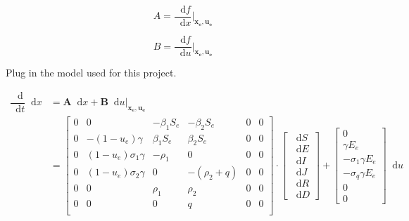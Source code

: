 \documentclass[fleqn]{article}
\newcommand*\diff{\mathop{}\!\mathrm{d}}
\begin{document}
\begin{equation*}
    A = \dfrac{\diff f}{\diff x} \bigg\rvert_{\bm{x_e}, \bm{u_e}}
\end{equation*}

\begin{equation*}
    B = \dfrac{\diff f}{\diff u} \bigg\rvert_{\bm{x_e}, \bm{u_e}}
\end{equation*}

Plug in the model used for this project.

\begin{equation*}
    \begin{split}
        \dfrac{\diff}{\diff t} \diff x & = \bm{A} \diff x + \bm{B} \diff u \bigg\rvert_{\bm{x_e}, \bm{u_e}} \\
            & = \begin{bmatrix}
                0 & 0 & {-\beta_1 S_e} & {-\beta_2 S_e} & 0 & 0 \\
                0 & -(1 - u_e) \gamma & {\beta_1 S_e} & {\beta_2 S_e} & 0 & 0 \\
                0 & (1 - u_e) \sigma_1 \gamma & -\rho_1 & 0 & 0 & 0 \\
                0 & (1 - u_e) \sigma_2 \gamma & 0 & -(\rho_2 + q) & 0 & 0 \\
                0 & 0 & \rho_1 & \rho_2 & 0 & 0 \\
                0 & 0 & 0 & q & 0 & 0 \\
            \end{bmatrix} \cdot \begin{bmatrix}
                \diff S \\
                \diff E \\
                \diff I \\
                \diff J \\
                \diff R \\
                \diff D
            \end{bmatrix} + \begin{bmatrix}
                0 \\
                \gamma E_e \\
                -\sigma_1 \gamma E_e \\
                -\sigma_q \gamma E_e \\
                0 \\
                0
            \end{bmatrix} \diff u
    \end{split}
\end{equation*}
\end{document}
